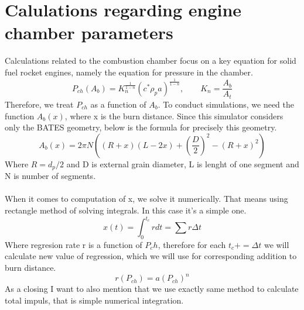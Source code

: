 \documentclass{article}
\begin{document}
\section{Calulations regarding engine chamber parameters}
Calculations related to the combustion chamber focus on a key equation for solid fuel rocket engines, namely the equation for pressure in the chamber.
\begin{equation}
P_{ch}(A_b)=K_n^{\frac{1}{1-n}}(c^*\rho_pa)^{\frac{1}{1-n}}, \qquad K_n = \frac{A_b}{A_t}
\end{equation}
Therefore, we treat $P_{ch}$ as a function of $A_b$. To conduct simulations, we need the function $A_b(x)$, where x is the burn distance. Since this simulator considers only the BATES geometry, below is the formula for precisely this geometry.
\begin{equation}
A_b(x) = 2\pi N ((R+x)(L-2x) + \left(\frac{D}{2}\right)^2 - (R+x)^2)
\end{equation}
Where $R = d_p/2$ and D is external grain diameter, L is lenght of one segment and N is number of segments.\\\\
When it comes to computation of x, we solve it numerically. That means using rectangle method of solving integrals. In this case it's a simple one.
\begin{equation}
x(t) = \int^{t_c}_0 r dt = \sum r \Delta t
\end{equation}
Where regresion rate r is a function of $P_ch$, therefore for each $t_c+=\Delta t$ we will calculate new value of regression, which we will use for corresponding addition to burn distance.
$$r(P_{ch}) = a(P_{ch})^n$$
As a closing I want to also mention that we use exactly same method to calculate total impuls, that is simple numerical integration.
\end{document}
